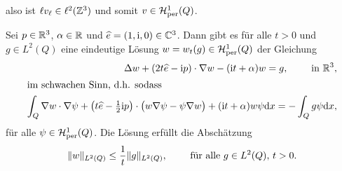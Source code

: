 also ist \(\ell v_\ell\in\ell^2(\mathbb{Z}^3)\) und somit \(v\in\mathcal{H}_{\mathrm{per}}^1(Q)\).
\begin{lem}\label{lem: eind. lösung w im schwachen sinn}
	Sei \(p\in\mathbb{R}^3\), \(\alpha\in\mathbb{R}\) und \(\widehat{e}=(1,\mathrm{i},0)\in\mathbb{C}^3\). Dann gibt es für alle \(t>0\) und \(g\in L^2(Q)\) eine eindeutige Lösung \(w=w_t(g)\in\mathcal{H}_{\mathrm{per}}^1(Q)\) der Gleichung
	\begin{subequations}
		\label{eind. lösung w im schwachen sinn}
		\begin{align}
			\Delta w+(2t\widehat{e}-\mathrm{i} p)\cdot\nabla w-(\mathrm{i} t+\alpha)w=g,\qquad\text{ in }\mathbb{R}^3,\\
			\shortintertext{im schwachen Sinn, d.h. sodass}
			\label{eind. lösung w im schwachen sinn b}
			\int_Q\nabla w\cdot\nabla\psi+\big(t\widehat{e}-\tfrac{1}{2}\mathrm{i} p\big)\cdot\big(w\nabla\psi-\psi\nabla w\big)+(\mathrm{i} t+\alpha)w\psi\mathrm{d}x=-\int_Qg\psi\mathrm{d}x,
		\end{align}
	\end{subequations}
	für alle \(\psi\in\mathcal{H}_{\mathrm{per}}^1(Q)\). Die Lösung erfüllt die Abschätzung
	\begin{equation*}
		\|w\|_{L^2(Q)}\leq\frac{1}{t}\|g\|_{L^2(Q)},\qquad\text{ für alle }g\in L^2(Q),\,t>0.
	\end{equation*}
\end{lem}
